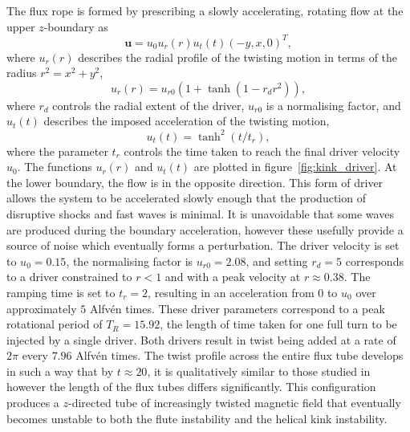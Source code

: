 \documentclass[fleqn,usenatbib]{mnras}
\newcommand{\rs}[2]{{#2}}
\renewcommand{\vec}[1]{{\bm #1}}
\begin{document}
The flux rope is formed by prescribing a slowly accelerating, rotating flow at the upper $z$-boundary as
\begin{equation}
  \label{eq:null_twisting_profile}
  \vec{u} = u_0 u_r(r) u_t(t) (-y, x, 0)^T,
\end{equation}
where $u_r(r)$ describes the radial profile of the twisting motion in terms of the radius $r^2 = x^2 + y^2$,
\begin{equation}
  \label{eq:radial_twisting_function}
  u_r(r) = u_{r0}(1 + \tanh(1 - r_d r^2)),
\end{equation}
where $r_d$ controls the radial extent of the driver, $u_{r0}$ is a normalising factor, and $u_t(t)$ describes the imposed acceleration of the twisting motion,
\begin{equation}
  \label{eq:ramping_up_function}
  u_t(t) = \tanh^2(t/t_r),
\end{equation}
where the parameter $t_r$ controls the time taken to reach the final driver velocity $u_0$. The functions $u_r(r)$ and $u_t(t)$ are plotted in figure~\ref{fig:kink_driver}. At the lower boundary, the flow is in the opposite direction. This form of driver allows the system to be accelerated slowly enough that the production of disruptive shocks and fast waves is minimal. It is unavoidable that some waves are produced during the boundary acceleration, however these usefully provide \rs{one}{a} source of noise which eventually forms a perturbation.
\rs{}{
The driver} velocity is set to $u_0 = 0.15$, the normalising factor is $u_{r0} = 2.08$, and setting $r_d = 5$ corresponds to a driver constrained to $r<1$ and with a peak velocity at $r\approx 0.38$. The ramping time is set to $t_r = 2$, resulting in an acceleration from $0$ to $u_0$ over approximately $5$ Alfv\'en times. These driver parameters correspond to a peak rotational period of $T_R = 15.92$, the length of time taken for one full turn to be injected by a single driver. Both drivers result in twist being added at a rate of $2\pi$ every $7.96$ Alfv\'en times. The twist profile across the entire flux tube develops in such a way that by $t\approx 20$, it is qualitatively similar to those studied in~\citep{quinnEffectAnisotropicViscosity2020,hoodCoronalHeatingMagnetic2009,barefordShockHeatingNumerical2015} however the length of the flux tubes differs significantly. This configuration produces a $z$-directed tube of increasingly twisted magnetic field that eventually becomes unstable to both the \rs{fluting}{flute} instability and the helical kink instability.
\end{document}
